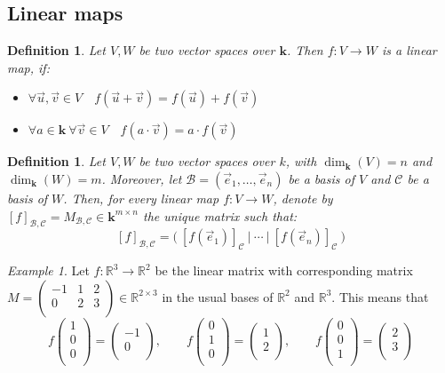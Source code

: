 \documentclass{article}
\newtheorem{definition}[theorem]{Definition}
\theoremstyle{remark}
\newtheorem{example}[theorem]{Example}
\begin{document}
    \subsection{Linear maps}
    \begin{definition}
        Let $V,W$ be two vector spaces over $\mathbf{k}$. Then $f:V\to W$ is a linear map, if:
        \begin{itemize}
            \item $\forall \vec{u},\vec{v}\in V\quad f(\vec{u}+\vec{v})=f(\vec{u})+f(\vec{v})$
            \item $\forall a\in\mathbf{k}\ \forall \vec{v}\in V\quad f(a\cdot\vec{v})=a\cdot f(\vec{v})$
        \end{itemize}
    \end{definition}
    \begin{definition} Let $V,W$ be two vector spaces over $k$, with $\dim_{\mathbf{k}}(V)=n$ and $\dim_{\mathbf{k}}(W)=m$. Moreover, let $\mathcal{B}=(\vec{e}_1,\ldots,\vec{e}_n)$ be a basis of $V$ and $\mathcal{C}$ be a basis of $W$. Then, for every linear map $f:V\to W$, denote by $[f]_{\mathcal{B},\mathcal{C}}=M_{\mathcal{B},\mathcal{C}}\in\mathbf{k}^{m\times n}$ the unique matrix such that:
        \[[f]_{\mathcal{B},\mathcal{C}}=\Big(\ [f(\vec{e}_1)]_{\mathcal{C}}\ \Big|\ \cdots\ \Big|\ [f(\vec{e}_n)]_{\mathcal{C}}\ \Big)\]
    \end{definition}
    \begin{example} Let $f:\mathbb{R}^3\to\mathbb{R}^2$ be the linear matrix with corresponding matrix $M=\begin{pmatrix}-1&1&2\\0&2&3\\\end{pmatrix}\in\mathbb{R}^{2\times 3}$ in the usual bases of $\mathbb{R}^2$ and $\mathbb{R}^3$. This means that
        \[f\begin{pmatrix}1\\0\\0\\\end{pmatrix}=\begin{pmatrix}-1\\0\\\end{pmatrix},\qquad
          f\begin{pmatrix}0\\1\\0\\\end{pmatrix}=\begin{pmatrix}1\\2\\\end{pmatrix},\qquad
          f\begin{pmatrix}0\\0\\1\\\end{pmatrix}=\begin{pmatrix}2\\3\\\end{pmatrix}\]
    \end{example}
\end{document}
